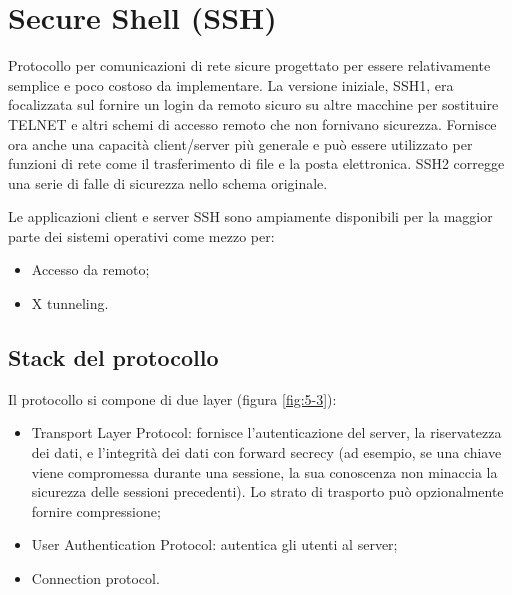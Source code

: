 \section{Secure Shell (SSH)}

Protocollo per comunicazioni di rete sicure progettato per essere relativamente semplice e poco costoso da implementare. La versione iniziale, SSH1, era focalizzata sul fornire un login da remoto sicuro su altre macchine per sostituire TELNET e altri schemi di accesso remoto che non fornivano sicurezza. 
Fornisce ora anche una capacità client/server più generale e può essere utilizzato per funzioni di rete come il trasferimento di file e la posta elettronica.
SSH2 corregge una serie di falle di sicurezza nello schema originale.

Le applicazioni client e server SSH sono ampiamente disponibili per la maggior parte dei sistemi operativi come mezzo per:
\begin{itemize}
    \item Accesso da remoto;
	\item X tunneling.
\end{itemize}

\subsection{Stack del protocollo}
Il protocollo si compone di due layer (figura \ref{fig:5-3}):
\begin{itemize}
    \item Transport Layer Protocol: fornisce l'autenticazione del server, la riservatezza dei dati, e l'integrità dei dati con forward secrecy (ad esempio, se una chiave viene compromessa durante una sessione, la sua conoscenza non minaccia la sicurezza delle sessioni precedenti). Lo strato di trasporto può opzionalmente fornire compressione;
	\item User Authentication Protocol: autentica gli utenti al server;
    \item Connection protocol.
\end{itemize}

